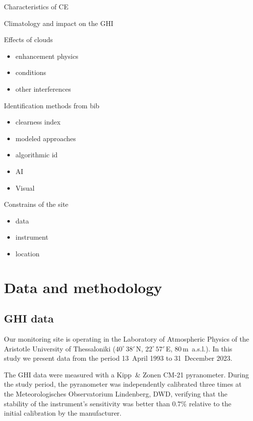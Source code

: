 \documentclass[
]{article}
\providecommand{\tightlist}{%
  \setlength{\itemsep}{0pt}\setlength{\parskip}{0pt}}
\begin{document}
Characteristics of CE

Climatology and impact on the GHI

Effects of clouds

\begin{itemize}
\tightlist
\item
  enhancement physics
\item
  conditions
\item
  other interferences
\end{itemize}

Identification methods from bib

\begin{itemize}
\tightlist
\item
  clearness index
\item
  modeled approaches
\item
  algorithmic id
\item
  AI
\item
  Visual
\end{itemize}

Constrains of the site

\begin{itemize}
\tightlist
\item
  data
\item
  instrument
\item
  location
\end{itemize}

\hypertarget{data-and-methodology}{%
\section{Data and methodology}\label{data-and-methodology}}

\hypertarget{ghi-data}{%
\subsection{GHI data}\label{ghi-data}}

Our monitoring site is operating in the Laboratory of Atmospheric Physics of the
Aristotle University of Thessaloniki (\(40^\circ\,38'\,\)N,
\(22^\circ\,57'\,\)E, \(80\,\)m~a.s.l.).
In this study we present data from the period
13~April 1993 to
31~December 2023.

The GHI data were measured with a Kipp~\& Zonen CM-21 pyranometer.
During the study period, the pyranometer was independently calibrated three times at
the Meteorologisches Observatorium Lindenberg, DWD, verifying that the stability of
the instrument's sensitivity was better than \(0.7\%\) relative to the initial
calibration by the manufacturer.
\end{document}
